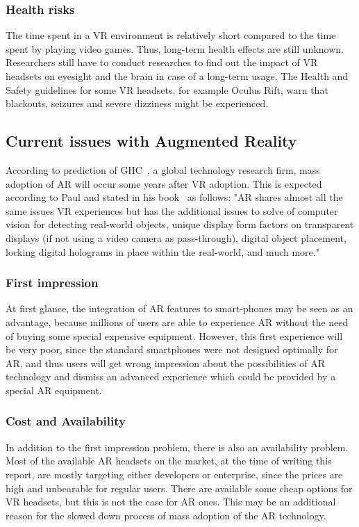 \documentclass[12pt]{article}
\begin{document}
\subsubsection{Health risks} \label{sec:Health risks}
The time spent in a \ac{VR} environment is relatively short compared to the time spent by playing video games. Thus, long-term health effects are still unknown. Researchers still have to conduct researches to find out the impact of \ac{VR} headsets on eyesight and the brain in case of a long-term usage. The Health and Safety guidelines for some \ac{VR} headsets, for example Oculus Rift, warn that blackouts, seizures and severe dizziness might be experienced.

\subsection{Current issues with Augmented Reality}\label{sec:Current issues with Augmented Reality}
According to prediction of \ac{GHC}~\cite{gartnerPrediction}, a global technology research firm, mass adoption of \ac{AR} 
will occur some years after \ac{VR} adoption. This is expected according to Paul and stated in his book~\cite{dummies} as follows: "\ac{AR} shares almost all the same issues \ac{VR} experiences but has the additional issues to solve of computer vision for detecting real-world objects, unique display form factors on transparent displays (if not using a video camera as pass-through), digital object placement, locking digital holograms in place within the real-world, and much more."

\subsubsection{First impression}\label{sec:First impression}
At first glance, the integration of \ac{AR} features to smart-phones may be seen as an advantage, because millions of users are able to experience \ac{AR} without the need of buying some special expensive equipment. However, this first experience will be very poor, since the standard smartphones were not designed optimally for \ac{AR}, and thus users will get wrong impression about the possibilities of \ac{AR} technology and dismiss an advanced experience which could be provided by a special \ac{AR} equipment.

\subsubsection{Cost and Availability} \label{sec:Cost and Availability}
In addition to the first impression problem, there is also an availability problem. Most of the available \ac{AR} headsets on the market, at the time of writing this report, are mostly targeting either developers or enterprise, since the prices are high and unbearable for regular users. There are available some cheap options for \ac{VR} headsets, but this is not the case for \ac{AR} ones. This may be an additional reason for the slowed down process of mass adoption of the \ac{AR} technology.
\end{document}
